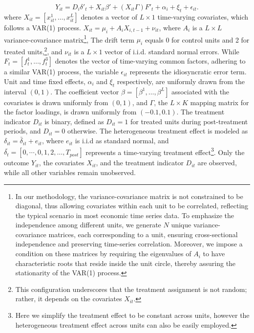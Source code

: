 \documentclass[12pt]{article}
\begin{document}
\begin{equation}
Y_{it} = D_{i} \delta'_{t} + X_{it}\beta' + (X_{it}\Gamma) F'_{t} + \alpha_i + \xi_t + \epsilon_{it}.
\tag{6}
\label{eq: dgp}
\end{equation}
where $X_{it} = [x_{it}^1, \ldots, x_{it}^{L}]$ denotes a vector of $L \times 1$ time-varying covariates, which follows a VAR(1) process. $X_{it} = \mu_i + A_i X_{i,t-1} + \nu_{it}$, where $A_i$ is a $ L \times L$ variance-covariance matrix\footnote{In our methodology, the variance-covariance matrix is not constrained to be diagonal, thus allowing covariates within each unit to be correlated, reflecting the typical scenario in most economic time series data. To emphasize the independence among different units, we generate $N$ unique variance-covariance matrices, each corresponding to a unit, ensuring cross-sectional independence and preserving time-series correlation. Moreover, we impose a condition on these matrices by requiring the eigenvalues of $A_i$ to have characteristic roots that reside inside the unit circle, thereby assuring the stationarity of the VAR(1) process.}, The drift term $\mu_i$ equals 0 for control units and 2 for treated units,\footnote{This configuration underscores that the treatment assignment is not random; rather, it depends on the covariates $X_{it}$.}, and $\nu_{it}$ is a $L \times 1$ vector of i.i.d. standard normal errors. While $F_t = [f_t^1, \ldots, f_t^3]$ denotes the vector of time-varying common factors, adhering to a similar VAR(1) process, the variable $\epsilon_{it}$ represents the idiosyncratic error term. Unit and time fixed effects, $\alpha_i$ and $\xi_{t}$ respectively, are uniformly drawn from the interval $(0,1)$. The coefficient vector $\beta = [\beta^1, \ldots, \beta^{L}]$ associated with the covariates is drawn uniformly from $(0,1)$, and $\Gamma$, the $L \times K$ mapping matrix for the factor loadings, is drawn uniformly from $(-0.1, 0.1)$. The treatment indicator $D_{it}$ is binary, defined as $D_{it} = 1$ for treated units during post-treatment periods, and $D_{it} = 0$ otherwise. The heterogeneous treatment effect is modeled as $\delta_{it} = \bar{\delta}_{it} + e_{it}$, where $e_{it}$ is i.i.d as standard normal, and $\bar{\delta_t} = [0, \cdots, 0, 1,2,\ldots,T_{post}]$ represents a time-varying treatment effect\footnote{Here we simplify the treatment effect to be constant across units, however the heterogeneous treatment effect across units can also be easily employed.}. Only the outcome $Y_{it}$, the covariates $X_{it}$, and the treatment indicator $D_{it}$ are observed, while all other variables remain unobserved.
\end{document}
